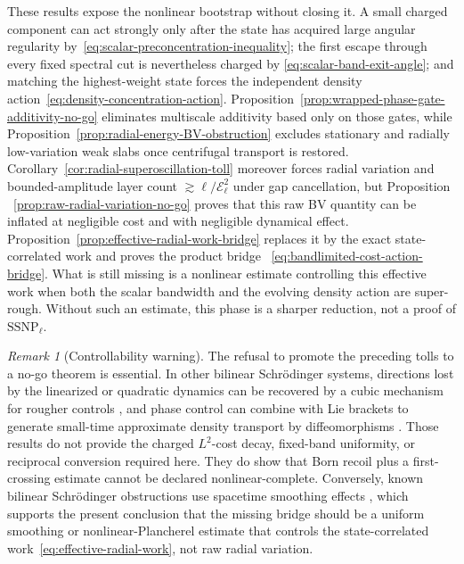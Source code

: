 \documentclass[11pt]{article}
\theoremstyle{definition}
\theoremstyle{remark}
\newtheorem{remark}[theorem]{Remark}
\begin{document}
These results expose the nonlinear bootstrap without closing it.  A
small charged component can act strongly only after the state has acquired
large angular regularity by~\eqref{eq:scalar-preconcentration-inequality}; the
first escape through every fixed spectral cut is nevertheless charged by
\eqref{eq:scalar-band-exit-angle}; and matching the highest-weight state forces
the independent density action~\eqref{eq:density-concentration-action}.
Proposition~\ref{prop:wrapped-phase-gate-additivity-no-go} eliminates
multiscale additivity based only on those gates, while
Proposition~\ref{prop:radial-energy-BV-obstruction} excludes stationary and
radially low-variation weak slabs once centrifugal transport is restored.
Corollary~\ref{cor:radial-superoscillation-toll} moreover forces radial
variation and bounded-amplitude layer count
$\gtrsim\ell/\mathcal E_\ell^2$ under gap cancellation, but Proposition
~\ref{prop:raw-radial-variation-no-go} proves that this raw BV quantity can be
inflated at negligible cost and with negligible dynamical effect.
Proposition~\ref{prop:effective-radial-work-bridge} replaces it by the exact
state-correlated work and proves the product bridge
~\eqref{eq:bandlimited-cost-action-bridge}.  What is still missing is a
nonlinear estimate controlling this effective work when both the scalar
bandwidth and the evolving density action are super-rough.  Without such an
estimate, this phase is a sharper reduction, not a proof of
$\mathrm{SSNP}_\ell$.

\begin{remark}[Controllability warning]
The refusal to promote the preceding tolls to a no-go theorem is essential.
In other bilinear Schr\"odinger systems, directions lost by the linearized or
quadratic dynamics can be recovered by a cubic mechanism for rougher controls
\cite{Bournissou2022}, and phase control can combine with Lie brackets to
generate small-time approximate density transport by diffeomorphisms
\cite{BeauchardPozzoli2025}.  Those results do not provide the charged
$L^2$-cost decay, fixed-band uniformity, or reciprocal conversion required
here.  They do show that Born recoil plus a first-crossing estimate cannot be
declared nonlinear-complete.  Conversely, known bilinear Schr\"odinger
obstructions use spacetime smoothing effects \cite{ChambrionThomann2020},
which supports the present conclusion that the missing bridge should be a
uniform smoothing or nonlinear-Plancherel estimate that controls the
state-correlated work~\eqref{eq:effective-radial-work}, not raw radial
variation.
\end{remark}
\end{document}
